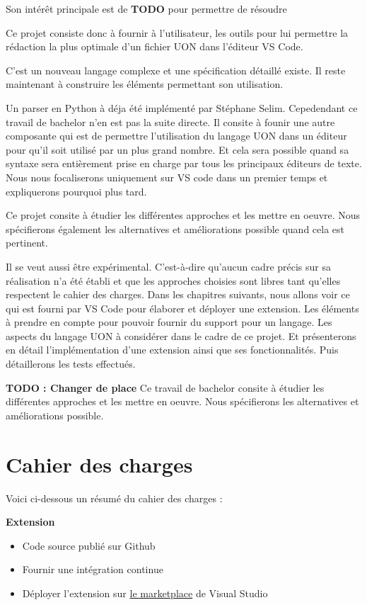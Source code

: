 \documentclass[
    iict, %
    il, %
]{heig-tb}
\begin{document}
Son intérêt principale est de \textbf{TODO} pour permettre de résoudre

Ce projet consiste donc à fournir à l'utilisateur, les outils pour lui permettre la rédaction la plus optimale d'un fichier UON
dans l'éditeur VS Code.

C'est un nouveau langage complexe et une spécification détaillé existe. Il reste maintenant à construire les éléments permettant son utilisation.

Un parser en Python à déja été implémenté par Stéphane Selim. Cepedendant ce travail de bachelor n'en est pas la suite directe.
Il consite à founir une autre composante qui est de permettre l'utilisation du langage UON dans un éditeur pour qu'il soit utilisé par un plus grand nombre.
Et cela sera possible quand sa syntaxe sera entièrement prise en charge par tous les principaux éditeurs de texte.
Nous nous focaliserons uniquement sur VS code dans un premier temps et expliquerons pourquoi plus tard.

Ce projet consite à étudier les différentes approches et les mettre en oeuvre. Nous spécifierons également les alternatives et améliorations possible quand cela est pertinent.

Il se veut aussi être expérimental. C'est-à-dire qu'aucun cadre précis sur sa réalisation n'a été établi et que les approches choisies sont libres tant qu'elles respectent le cahier des charges.
Dans les chapitres suivants, nous allons voir ce qui est fourni par VS Code pour élaborer et déployer une extension.
Les éléments à prendre en compte pour pouvoir fournir du support pour un langage.
Les aspects du langage UON à considérer dans le cadre de ce projet.
Et présenterons en détail l'implémentation d'une extension ainsi que ses fonctionnalités. Puis détaillerons les tests effectués.

\textbf{TODO : Changer de place}
Ce travail de bachelor consite à étudier les différentes approches et les mettre en oeuvre. Nous spécifierons les alternatives et améliorations possible.

\let\cleardoublepage\clearpage

\chapter{Cahier des charges}
Voici ci-dessous un résumé du cahier des charges :

\textbf{Extension}
\begin{itemize}
    \item Code source publié sur Github
    \item Fournir une intégration continue
    \item Déployer l'extension sur \href{https://marketplace.visualstudio.com/}{le marketplace} de Visual Studio
\end{itemize}
\end{document}
